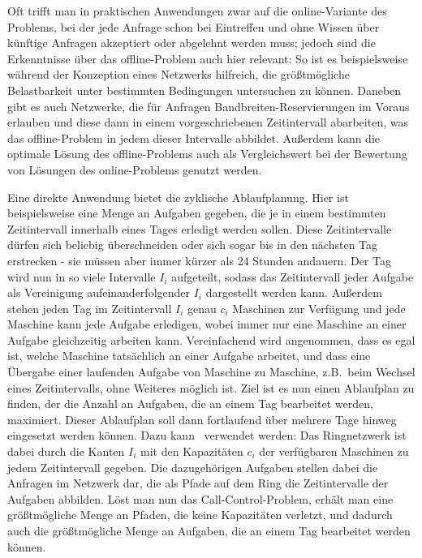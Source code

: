 Oft trifft man in praktischen Anwendungen zwar auf die online-Variante des Problems, bei der jede Anfrage schon bei Eintreffen und
ohne Wissen über künftige Anfragen akzeptiert oder abgelehnt werden muss;
jedoch sind die Erkenntnisse über das offline-Problem auch hier relevant:
So ist es beispielsweise während der Konzeption eines Netzwerks hilfreich, die größtmögliche Belastbarkeit unter bestimmten 
Bedingungen untersuchen zu können.
Daneben gibt es auch Netzwerke, die für Anfragen Bandbreiten-Reservierungen im Voraus erlauben und diese dann in einem 
vorgeschriebenen Zeitintervall abarbeiten, was das offline-Problem in jedem dieser Intervalle abbildet.
Außerdem kann die optimale Lösung des offline-Problems auch als Vergleichswert bei der Bewertung von Lösungen des
online-Problems genutzt werden.

Eine direkte Anwendung bietet die zyklische Ablaufplanung.
Hier ist beispielsweise eine Menge an Aufgaben gegeben, die je in einem bestimmten Zeitintervall innerhalb eines Tages erledigt werden sollen.
Diese Zeitintervalle dürfen sich beliebig überschneiden oder sich sogar bis in den nächsten Tag erstrecken - sie müssen aber immer kürzer 
als 24 Stunden andauern.
Der Tag wird nun in so viele Intervalle $I_i$ aufgeteilt, sodass das Zeitintervall jeder Aufgabe als Vereinigung  
aufeinanderfolgender $I_i$ dargestellt werden kann.
Außerdem stehen jeden Tag im Zeitintervall $I_i$ genau $c_i$ Maschinen zur Verfügung und jede Maschine kann jede Aufgabe erledigen, wobei immer nur 
eine Maschine an einer Aufgabe gleichzeitig arbeiten kann.
Vereinfachend wird angenommen, dass es egal ist, welche Maschine tatsächlich an einer Aufgabe arbeitet, und dass eine Übergabe einer laufenden
Aufgabe von Maschine zu Maschine, z.B.\ beim Wechsel eines Zeitintervalls, ohne Weiteres möglich ist.
Ziel ist es nun einen Ablaufplan zu finden, der die Anzahl an Aufgaben, die an einem Tag bearbeitet werden, maximiert.
Dieser Ablaufplan soll dann fortlaufend über mehrere Tage hinweg eingesetzt werden können.
Dazu kann \CallControl\ verwendet werden: Das Ringnetzwerk ist dabei durch die Kanten $I_i$ mit den Kapazitäten $c_i$ der verfügbaren Maschinen
zu jedem Zeitintervall gegeben. Die dazugehörigen Aufgaben stellen dabei die Anfragen im Netzwerk dar, die als Pfade auf dem Ring die Zeitintervalle
der Aufgaben abbilden.
Löst man nun das Call-Control-Problem, erhält man eine größtmögliche Menge an Pfaden, die keine Kapazitäten verletzt, und dadurch auch die
größtmögliche Menge an Aufgaben, die an einem Tag bearbeitet werden können.

